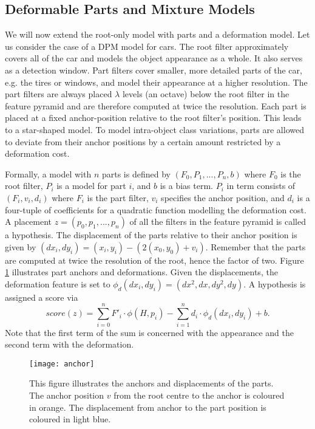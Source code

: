 \subsection{Deformable Parts and Mixture Models}\label{sec:defParts}
We will now extend the root-only model with parts and a deformation model. Let us consider the case of a DPM model for cars. The root filter approximately covers all of the car and models the object appearance as a whole. It also serves as a detection window. Part filters cover smaller, more detailed parts of the car, e.g. the tires or windows, and model their appearance at a higher resolution. The part filters are always placed $\lambda$ levels (an octave) below the root filter in the feature pyramid and are therefore computed at twice the resolution. Each part is placed at a fixed anchor-position relative to the root filter's position. This leads to a star-shaped model. To model intra-object class variations, parts  are allowed to deviate from their anchor positions by a certain amount restricted by a deformation cost.

Formally, a model with $n$ parts is defined by $(F_0,P_1,...,P_n,b)$ where $F_0$ is the root filter, $P_i$ is a model for part $i$, and $b$ is a bias term. $P_i$ in term consists of $(F_i, v_i, d_i)$ where $F_i$ is the part filter, $v_i$ specifies the anchor position, and $d_i$ is a four-tuple of coefficients for a quadratic  function modelling the deformation cost. A placement $z=(p_0,p_1,...,p_n)$ of all the filters in the feature pyramid is called a hypothesis. The displacement of the parts relative to their anchor position is given by $(dx_i,dy_i)=(x_i,y_i)-(2(x_0,y_0)+v_i)$. Remember that the parts are computed at twice the resolution of the root, hence the factor of two. Figure \ref{fig:anchor} illustrates part anchors and deformations.  Given the displacements, the deformation feature is set to $\phi_d (dx_i,dy_i)=(dx^2,dx,dy^2,dy)$. A hypothesis is assigned a score via
\begin{equation}\label{eq:score}
score(z)=\sum_{i=0}^n F'_i\cdot \phi(H,p_i)-\sum_{i=1}^n d_i\cdot \phi_d (dx_i,dy_i)+b.
\end{equation}
Note that the first term of the sum is concerned with the appearance and the second term with the deformation. 

\begin{figure}[]
\begin{center}
\texttt{[image: anchor]}           
\caption{This figure illustrates the anchors and displacements of the parts. The anchor position $v$ from the root centre  to the anchor is coloured in orange. The displacement from anchor to the part position is coloured in light blue.  }
\label{fig:anchor}
\end{center}
\end{figure}

